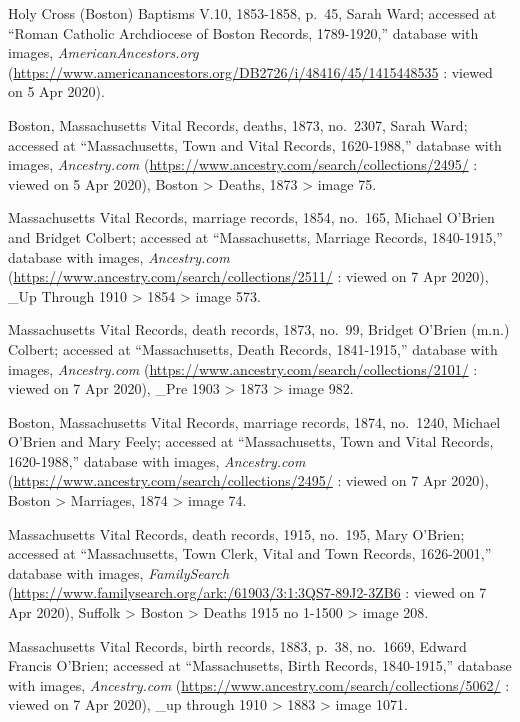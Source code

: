 \begin{thebibliography}{999}
	Holy Cross (Boston) Baptisms V.10, 1853-1858, p.\ 45, Sarah Ward; accessed at ``Roman Catholic Archdiocese of Boston Records, 1789-1920,'' database with images, \textit{AmericanAncestors.org} (\url{https://www.americanancestors.org/DB2726/i/48416/45/1415448535} : viewed on 5 Apr 2020).	
	
	Boston, Massachusetts Vital Records, deaths, 1873, no.\ 2307, Sarah Ward; accessed at ``Massachusetts, Town and Vital Records, 1620-1988,'' database with images, \textit{Ancestry.com} (\url{https://www.ancestry.com/search/collections/2495/} : viewed on 5 Apr 2020), Boston > Deaths, 1873 > image 75.
	
	Massachusetts Vital Records, marriage records, 1854, no.\ 165, Michael O'Brien and Bridget Colbert; accessed at ``Massachusetts, Marriage Records, 1840-1915,'' database with images, \textit{Ancestry.com} (\url{https://www.ancestry.com/search/collections/2511/} : viewed on 7 Apr 2020), \_Up Through 1910 > 1854 > image 573.
	
	Massachusetts Vital Records, death records, 1873, no.\ 99, Bridget O'Brien (m.n.) Colbert; accessed at ``Massachusetts, Death Records, 1841-1915,'' database with images, \textit{Ancestry.com} (\url{https://www.ancestry.com/search/collections/2101/} : viewed on 7 Apr 2020), \_Pre 1903 > 1873 > image 982.
	
	Boston, Massachusetts Vital Records, marriage records, 1874, no.\ 1240, Michael O'Brien and Mary Feely; accessed at ``Massachusetts, Town and Vital Records, 1620-1988,'' database with images, \textit{Ancestry.com} (\url{https://www.ancestry.com/search/collections/2495/} : viewed on 7 Apr 2020), Boston > Marriages, 1874 > image 74.
	
	Massachusetts Vital Records, death records, 1915, no.\ 195, Mary O'Brien; accessed at ``Massachusetts, Town Clerk, Vital and Town Records, 1626-2001,'' database with images, \textit{FamilySearch} (\url{https://www.familysearch.org/ark:/61903/3:1:3QS7-89J2-3ZB6} : viewed on 7 Apr 2020), Suffolk > Boston > Deaths 1915 no 1-1500 > image 208.
	
	Massachusetts Vital Records, birth records, 1883, p.\ 38, no.\ 1669, Edward Francis O'Brien; accessed at ``Massachusetts, Birth Records, 1840-1915,'' database with images, \textit{Ancestry.com} (\url{https://www.ancestry.com/search/collections/5062/} : viewed on 7 Apr 2020), \_up through 1910 > 1883 > image 1071.
	

\end{thebibliography}
